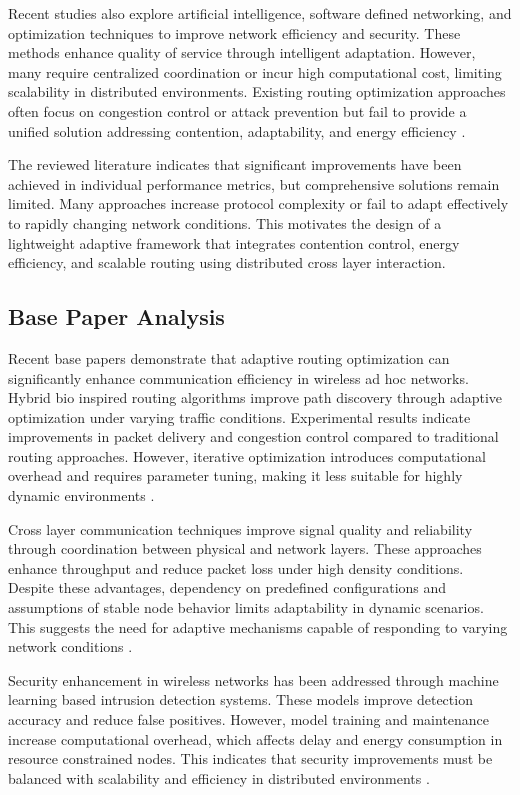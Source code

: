 \documentclass[a4paper,fleqn,final,1p]{cas-dc}
\numberwithin{equation}{section}
\begin{document}
Recent studies also explore artificial intelligence, software defined networking, and optimization techniques to improve network efficiency and security. These methods enhance quality of service through intelligent adaptation. However, many require centralized coordination or incur high computational cost, limiting scalability in distributed environments. Existing routing optimization approaches often focus on congestion control or attack prevention but fail to provide a unified solution addressing contention, adaptability, and energy efficiency \cite{hemalatha2024, ojeda2024, allaw2024, naeem2024, srinivasan2024}.

The reviewed literature indicates that significant improvements have been achieved in individual performance metrics, but comprehensive solutions remain limited. Many approaches increase protocol complexity or fail to adapt effectively to rapidly changing network conditions. This motivates the design of a lightweight adaptive framework that integrates contention control, energy efficiency, and scalable routing using distributed cross layer interaction.

\subsection{Base Paper Analysis}

Recent base papers demonstrate that adaptive routing optimization can significantly enhance communication efficiency in wireless ad hoc networks. Hybrid bio inspired routing algorithms improve path discovery through adaptive optimization under varying traffic conditions. Experimental results indicate improvements in packet delivery and congestion control compared to traditional routing approaches. However, iterative optimization introduces computational overhead and requires parameter tuning, making it less suitable for highly dynamic environments \cite{SanthoshKumar2025280}.

Cross layer communication techniques improve signal quality and reliability through coordination between physical and network layers. These approaches enhance throughput and reduce packet loss under high density conditions. Despite these advantages, dependency on predefined configurations and assumptions of stable node behavior limits adaptability in dynamic scenarios. This suggests the need for adaptive mechanisms capable of responding to varying network conditions \cite{Rasulov2025116}.

Security enhancement in wireless networks has been addressed through machine learning based intrusion detection systems. These models improve detection accuracy and reduce false positives. However, model training and maintenance increase computational overhead, which affects delay and energy consumption in resource constrained nodes. This indicates that security improvements must be balanced with scalability and efficiency in distributed environments \cite{Aluri2025707}.
\end{document}

